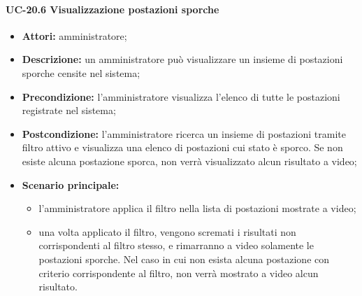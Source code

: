 \paragraph{UC-20.6 Visualizzazione postazioni sporche}
\begin{itemize}
    \item \textbf{Attori:} amministratore;
    \item \textbf{Descrizione:} un amministratore pu\`{o} visualizzare un insieme di postazioni sporche censite nel sistema;
    \item \textbf{Precondizione:} l'amministratore visualizza l'elenco di tutte le postazioni registrate nel sistema;
    \item \textbf{Postcondizione:} l'amministratore ricerca un insieme di postazioni tramite filtro attivo e visualizza una elenco di postazioni cui stato è sporco. Se non esiste alcuna postazione sporca, non verrà visualizzato alcun risultato a video;
    \item \textbf{Scenario principale:}
    \begin{itemize}
        \item l'amministratore applica il filtro nella lista di postazioni mostrate a video;
        \item una volta applicato il filtro, vengono scremati i risultati non corrispondenti al filtro stesso, e rimarranno a video solamente le postazioni sporche. Nel caso in cui non esista alcuna postazione con criterio corrispondente al filtro, non verrà mostrato a video alcun risultato.
    \end{itemize}
\end{itemize}


